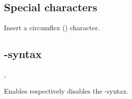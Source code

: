 \documentclass[11pt, cm-default]{l3doc}
\begin{document}
	\subsection{Special characters}
	\begin{function}{\cir}
		\begin{syntax}
		\end{syntax}
		Insert a circumflex (\cir) character.
	\end{function}



	\subsection{-syntax}
	\begin{function}{\enableeasyformat, \disableeasyformat}
		\begin{syntax}
		\end{syntax}
		Enables respectively disables the -syntax.
	\end{function}
	

\end{document}
